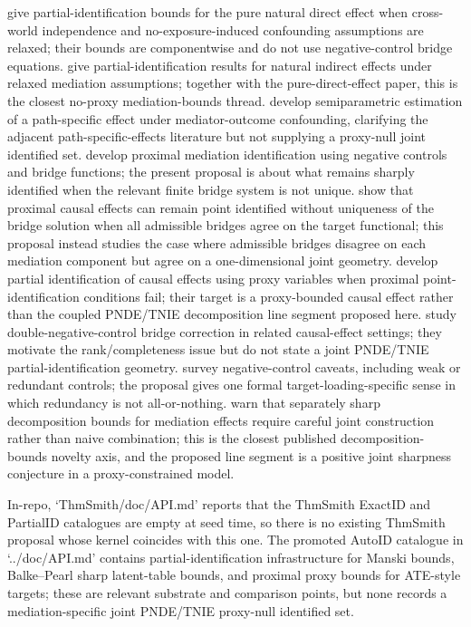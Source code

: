 \documentclass[11pt]{article}
\theoremstyle{definition}
\theoremstyle{plain}
\theoremstyle{remark}
\begin{document}
\citet{MilesKankiMeloniTchetgen2015} give partial-identification bounds for
the pure natural direct effect when cross-world independence and
no-exposure-induced confounding assumptions are relaxed; their bounds are
componentwise and do not use negative-control bridge equations.
\citet{MilesKankiMeloniTchetgen2017} give partial-identification results for
natural indirect effects under relaxed mediation assumptions; together with
the pure-direct-effect paper, this is the closest no-proxy mediation-bounds
thread.  \citet{MilesShpitserKankiMeloniTchetgen2017Path} develop
semiparametric estimation of a path-specific effect under
mediator-outcome confounding, clarifying the adjacent path-specific-effects
literature but not supplying a proxy-null joint identified set.
\citet{DukesShpitserTchetgen2023}
develop proximal mediation identification using negative controls and bridge
functions; the present proposal is about what remains sharply identified when
the relevant finite bridge system is not unique.
\citet{ZhangLiMiaoTchetgen2023} show that proximal causal effects can remain
point identified without uniqueness of the bridge solution when all admissible
bridges agree on the target functional; this proposal instead studies the
case where admissible bridges disagree on each mediation component but agree
on a one-dimensional joint geometry.
\citet{GhassamiShpitserTchetgen2023} develop partial identification of causal
effects using proxy variables when proximal point-identification conditions
fail; their target is a proxy-bounded causal effect rather than the coupled
PNDE/TNIE decomposition line segment proposed here.
\citet{MiaoShiLiTchetgen2024} study double-negative-control bridge correction
in related causal-effect settings; they motivate the rank/completeness issue
but do not state a joint PNDE/TNIE partial-identification geometry.
\citet{PenningDeVriesGroenwold2023} survey negative-control caveats,
including weak or redundant controls; the proposal gives one formal
target-loading-specific sense in which redundancy is not all-or-nothing.
\citet{GabrielSachsSjolander2023} warn that separately sharp decomposition
bounds for mediation effects require careful joint construction rather than
naive combination; this is the closest published decomposition-bounds novelty
axis, and the proposed line segment is a positive joint sharpness conjecture
in a proxy-constrained model.

In-repo, `ThmSmith/doc/API.md' reports that the ThmSmith ExactID and PartialID
catalogues are empty at seed time, so there is no existing ThmSmith proposal
whose kernel coincides with this one.  The promoted AutoID catalogue in
`../doc/API.md' contains partial-identification infrastructure for Manski
bounds, Balke--Pearl sharp latent-table bounds, and proximal proxy bounds for
ATE-style targets; these are relevant substrate and comparison points, but
none records a mediation-specific joint PNDE/TNIE proxy-null identified set.
\end{document}
